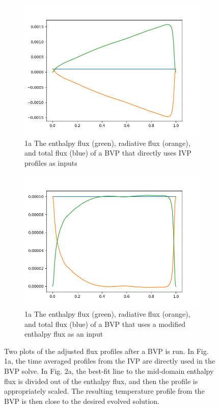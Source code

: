 \documentclass[aps, pre, onecolumn, nofootinbib, notitlepage, groupedaddress, amsfonts, amssymb, amsmath, longbibliography]{revtex4-1}
\begin{document}
\begin{figure}[b!]
\begin{subfigure}{.5\textwidth}
\centering
\includegraphics[width=.8\linewidth]{figs/fluxes_0000.png}
\caption{1a The enthalpy flux (green), radiative flux (orange), and total flux
(blue) of a BVP that directly uses IVP profiles as inputs}
\label{fig:sfig1}
\end{subfigure}%
\begin{subfigure}{.5\textwidth}
\centering
\includegraphics[width=.8\linewidth]{figs/fluxes_0001.png}
\caption{1a The enthalpy flux (green), radiative flux (orange), and total flux
(blue) of a BVP that uses a modified enthalpy flux as an input}
\end{subfigure}
\caption{Two plots of the adjusted flux profiles after a BVP is run. In
Fig. 1a, the time averaged profiles from the IVP are directly used in the BVP solve.
In Fig. 2a, the best-fit line to the mid-domain enthalpy flux is divided out of the enthalpy flux,
and then the profile is appropriately scaled.  The resulting temperature profile from the BVP is then
close to the desired evolved solution.}
\label{fig:bvp_results}
\end{figure}


\end{document}
